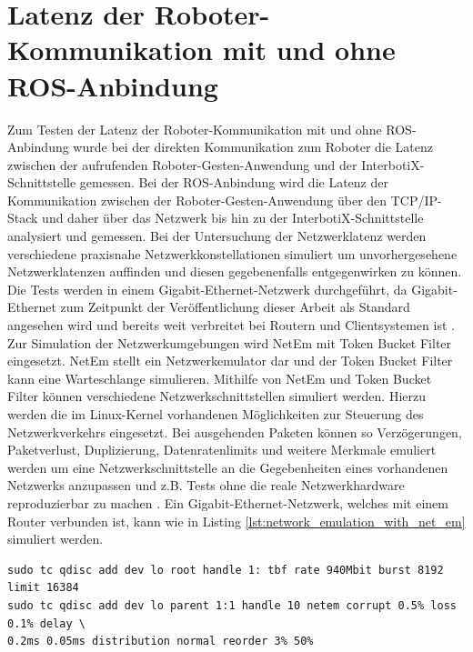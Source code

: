 \section{Latenz der Roboter-Kommunikation mit und ohne ROS-Anbindung}
Zum Testen der Latenz der Roboter-Kommunikation mit und ohne ROS-Anbindung wurde bei der direkten Kommunikation zum Roboter die Latenz zwischen der aufrufenden Roboter-Gesten-Anwendung und der InterbotiX-Schnittstelle gemessen. Bei der ROS-Anbindung wird die Latenz der Kommunikation zwischen der Roboter-Gesten-Anwendung über den TCP/IP-Stack und daher über das Netzwerk bis hin zu der InterbotiX-Schnittstelle analysiert und gemessen. Bei der Untersuchung der Netzwerklatenz werden verschiedene praxisnahe Netzwerkkonstellationen simuliert um unvorhergesehene Netzwerklatenzen auffinden und diesen gegebenenfalls entgegenwirken zu können. Die Tests werden in einem Gigabit-Ethernet-Netzwerk durchgeführt, da Gigabit-Ethernet zum Zeitpunkt der Veröffentlichung dieser Arbeit als Standard angesehen wird und bereits weit verbreitet bei Routern und Clientsystemen ist \cite{gigabit_ethernet_2020}.\\

Zur Simulation der Netzwerkumgebungen wird NetEm mit Token Bucket Filter eingesetzt. NetEm stellt ein Netzwerkemulator dar und der Token Bucket Filter kann eine Warteschlange simulieren. Mithilfe von NetEm und Token Bucket Filter können verschiedene Netzwerkschnittstellen simuliert werden. Hierzu werden die im Linux-Kernel vorhandenen Möglichkeiten zur Steuerung des Netzwerkverkehrs eingesetzt. Bei ausgehenden Paketen können so Verzögerungen, Paketverlust, Duplizierung, Datenratenlimits und weitere Merkmale emuliert werden um eine Netzwerkschnittstelle an die Gegebenheiten eines vorhandenen Netzwerks anzupassen und z.B. Tests ohne die reale Netzwerkhardware reproduzierbar zu machen \cite{hemminger_network_nodate}. Ein Gigabit-Ethernet-Netzwerk, welches mit einem Router verbunden ist, kann wie in Listing \ref{lst:network_emulation_with_net_em} simuliert werden.\newline\vspace{-1.0em}

\begin{lstlisting}[style=bash, caption={Gigabit-Ethernet-Netzwerksimulation inklusive Simulation einer Routeranbindung mit NetEm und Token Bucket Filter}, label={lst:network_emulation_with_net_em}]
sudo tc qdisc add dev lo root handle 1: tbf rate 940Mbit burst 8192 limit 16384
sudo tc qdisc add dev lo parent 1:1 handle 10 netem corrupt 0.5% loss 0.1% delay \
0.2ms 0.05ms distribution normal reorder 3% 50%
\end{lstlisting}\leavevmode\newline\vspace{-1.0em}

